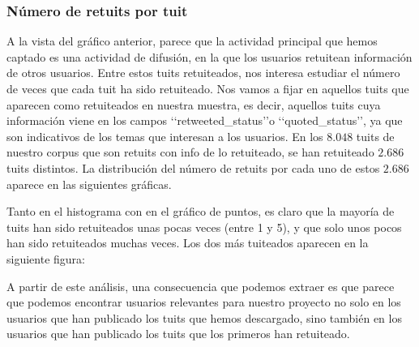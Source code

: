 
\subsubsection{Número de retuits por tuit}
A la vista del gráfico anterior, parece que la actividad principal que hemos captado es
una actividad de difusión, en la que los usuarios retuitean información de otros usuarios.
Entre estos tuits retuiteados, nos interesa estudiar el número de veces que 
cada tuit ha sido retuiteado. Nos vamos a fijar en aquellos tuits que aparecen como retuiteados en nuestra muestra, es decir, aquellos tuits cuya información viene en los campos \lq\lq retweeted\_status\rq\rq o \lq\lq quoted\_status\rq\rq,
ya que son indicativos de los temas que interesan a los usuarios.
En los $8.048$ tuits de nuestro corpus que son retuits con info de lo retuiteado, se han retuiteado $2.686$ tuits distintos. La distribución del número de retuits por cada uno de estos $2.686$ aparece en las siguientes
gráficas.


Tanto en el histograma con en el gráfico de puntos, es claro que la mayoría de tuits han sido retuiteados unas pocas
veces (entre 1 y 5), y que solo unos pocos han sido retuiteados muchas veces. Los dos más tuiteados aparecen en la siguiente figura:


A partir de este análisis, una consecuencia que podemos extraer es que 
parece que podemos encontrar usuarios relevantes 
para nuestro proyecto no solo en los usuarios que han publicado los tuits que hemos descargado, 
sino también en los usuarios que han publicado los tuits que los primeros han retuiteado.

